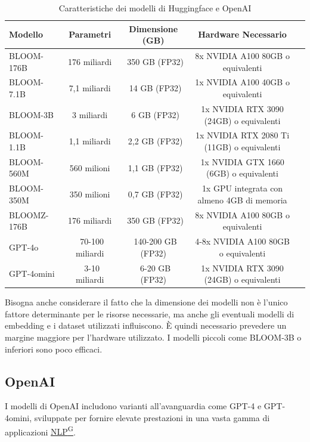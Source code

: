 \documentclass{article}
\begin{document}
\begin{table}[H]
    \centering
    \begin{tabular}{|l|c|c|c|l|}
        \hline
        \textbf{Modello} & \textbf{Parametri} & \textbf{Dimensione (GB)} & \textbf{Hardware Necessario} \\
        \hline
        BLOOM-176B & 176 miliardi & ~350 GB (FP32) & 8x NVIDIA A100 80GB o equivalenti  \\
        \hline
        BLOOM-7.1B & 7,1 miliardi & ~14 GB (FP32) & 1x NVIDIA A100 40GB o equivalenti \\
        \hline
        BLOOM-3B & 3 miliardi & ~6 GB (FP32) & 1x NVIDIA RTX 3090 (24GB) o equivalenti \\
        \hline
        BLOOM-1.1B & 1,1 miliardi & ~2,2 GB (FP32) & 1x NVIDIA RTX 2080 Ti (11GB) o equivalenti \\
        \hline
        BLOOM-560M & 560 milioni & ~1,1 GB (FP32) & 1x NVIDIA GTX 1660 (6GB) o equivalenti \\
        \hline
        BLOOM-350M & 350 milioni & ~0,7 GB (FP32) & 1x GPU integrata con almeno 4GB di memoria \\
        \hline
        BLOOMZ-176B & 176 miliardi & ~350 GB (FP32) & 8x NVIDIA A100 80GB o equivalenti \\
        \hline
        GPT-4o & ~70-100 miliardi & ~140-200 GB (FP32) & 4-8x NVIDIA A100 80GB o equivalenti \\
        \hline
        GPT-4omini & ~3-10 miliardi & ~6-20 GB (FP32) & 1x NVIDIA RTX 3090 (24GB) o equivalenti \\
        \hline
    \end{tabular}
    \caption{Caratteristiche dei modelli di Huggingface e OpenAI}
    \label{tab:modelli}
\end{table}
Bisogna anche considerare il fatto che la dimensione dei modelli non è l'unico fattore determinante per le risorse necessarie, ma anche gli eventuali modelli di embedding e i dataset utilizzati influiscono. È quindi necessario prevedere un margine maggiore per l'hardware utilizzato.
I modelli piccoli come BLOOM-3B o inferiori sono poco efficaci. 

\subsection{OpenAI}
I modelli di OpenAI includono varianti all'avanguardia come GPT-4 e GPT-4omini, sviluppate per fornire elevate prestazioni in una vasta gamma di applicazioni \href{https://code7crusaders.github.io/docs/RTB/documentazione_interna/glossario.html#natural-language-processing-nlp}{NLP\textsuperscript{G}}.
\end{document}
